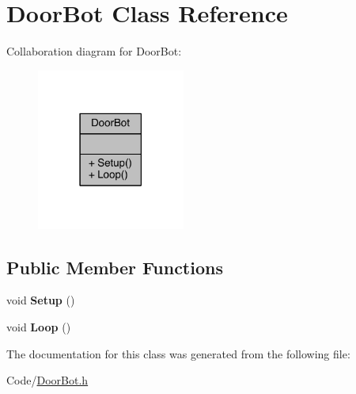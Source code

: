 \hypertarget{class_door_bot}{\section{Door\-Bot Class Reference}
\label{class_door_bot}
}


Collaboration diagram for Door\-Bot\-:\nopagebreak
\begin{figure}[H]
\begin{center}
\leavevmode
\includegraphics[width=138pt]{class_door_bot__coll__graph}
\end{center}
\end{figure}
\subsection*{Public Member Functions}
\begin{DoxyCompactItemize}
\item 
\hypertarget{class_door_bot_ada31c63915a7f9e3d29437db7c4f9b74}{void {\bfseries Setup} ()}\label{class_door_bot_ada31c63915a7f9e3d29437db7c4f9b74}

\item 
\hypertarget{class_door_bot_ae8803c3349bf017c886d64b687894c13}{void {\bfseries Loop} ()}\label{class_door_bot_ae8803c3349bf017c886d64b687894c13}

\end{DoxyCompactItemize}


The documentation for this class was generated from the following file\-:\begin{DoxyCompactItemize}
\item 
Code/\hyperlink{_door_bot_8h}{Door\-Bot.\-h}\end{DoxyCompactItemize}
